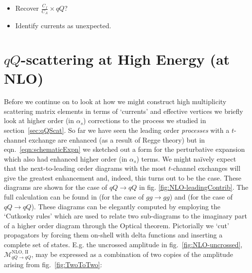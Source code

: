 			{\color{red}
			\begin{itemize}
				\item Recover $\frac{C_f}{C_A}\times qQ$?
				\item Identify currents as unexpected.
			\end{itemize}
			}

	\section{$qQ$-scattering at High Energy (at NLO)}
		\label{sub:HE22_NLO}

		Before we continue on to look at how we might construct high multiplicity scattering matrix
		elements in terms of `currents' and effective vertices we briefly look at higher order (in
		$\alpha_s$) corrections to the process we studied in section~\ref{sec:qQScat}.
		So far we have seen the leading order \emph{processes} with a $t$-channel exchange are enhanced (as a result
		of Regge theory) but in
		eqn.~\eqref{eqn:schematicExpn} we sketched out a form for the perturbative expansion which also
		had enhanced higher order (in $\alpha_s$) terms.  We might na\"ively expect that the next-to-leading
		order diagrams with the most $t$-channel exchanges will give the greatest enhancement and, indeed,
		this turns out to be the case.  These diagrams are shown for the case of $qQ\rightarrow qQ$ in fig.
		\eqref{fig:NLO-leadingContrib}. The full calculation can be found in \cite{DelDuca:1995hf} (for
		the case of $gg\rightarrow gg$) and \cite{sabioThesis} (for the case of $qQ\rightarrow qQ$).  These
		diagrams can be elegantly computed by employing the `Cutkosky rules' which are used to relate two
		sub-diagrams to the imaginary part of a higher order diagram through the Optical theorem.  Pictorially
		we `cut' propagators by forcing them on-shell with delta functions and inserting a complete set of
		states.  E.g. the uncrossed amplitude in fig.~\eqref{fig:NLO-uncrossed},
		$\mathcal{M}_{qQ\rightarrow qQ}^{\text{NLO, II}}$, may be expressed as a combination of two copies
		of the amplitude arising from fig.~\eqref{fig:TwoToTwo}:

